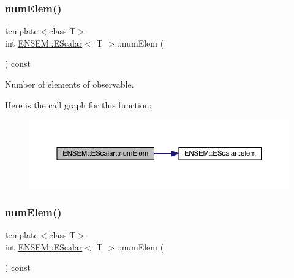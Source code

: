 \subsubsection{\texorpdfstring{numElem()}{numElem()}\hspace{0.1cm}{\footnotesize\ttfamily [1/2]}}
{\footnotesize\ttfamily template$<$class T$>$ \\
int \mbox{\hyperlink{classENSEM_1_1EScalar}{E\+N\+S\+E\+M\+::\+E\+Scalar}}$<$ T $>$\+::num\+Elem (\begin{DoxyParamCaption}{ }\end{DoxyParamCaption}) const\hspace{0.3cm}{\ttfamily [inline]}}



Number of elements of observable. 

Here is the call graph for this function\+:
\nopagebreak
\begin{figure}[H]
\begin{center}
\leavevmode
\includegraphics[width=350pt]{d0/d82/classENSEM_1_1EScalar_a63584568dc8b1817a57656cc072205b2_cgraph}
\end{center}
\end{figure}
\mbox{\label{classENSEM_1_1EScalar_a63584568dc8b1817a57656cc072205b2}} 
\subsubsection{\texorpdfstring{numElem()}{numElem()}\hspace{0.1cm}{\footnotesize\ttfamily [2/2]}}
{\footnotesize\ttfamily template$<$class T$>$ \\
int \mbox{\hyperlink{classENSEM_1_1EScalar}{E\+N\+S\+E\+M\+::\+E\+Scalar}}$<$ T $>$\+::num\+Elem (\begin{DoxyParamCaption}{ }\end{DoxyParamCaption}) const\hspace{0.3cm}{\ttfamily [inline]}}



